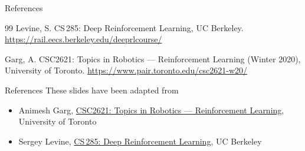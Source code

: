 \begin{frame}[allowframebreaks]{References}
\begin{thebibliography}{99}
\hypertarget{ref:8}{}
Levine, S. CS\,285: Deep Reinforcement Learning, UC Berkeley.
\newblock \url{https://rail.eecs.berkeley.edu/deeprlcourse/}

\hypertarget{ref:9}{}
Garg, A. CSC2621: Topics in Robotics --- Reinforcement Learning (Winter 2020), University of Toronto.
\newblock \url{https://www.pair.toronto.edu/csc2621-w20/}

\end{thebibliography}
\end{frame}

\begin{frame}{References}
These slides have been adapted from
\begin{itemize}
    \item Animesh Garg, \href{https://www.pair.toronto.edu/csc2621-w20/}{CSC2621: Topics in Robotics --- Reinforcement Learning}, University of Toronto \textbf{}
    \item Sergey Levine, \href{https://rail.eecs.berkeley.edu/deeprlcourse/}{CS\,285: Deep Reinforcement Learning}, UC Berkeley \textbf{}
\end{itemize}
\end{frame}
